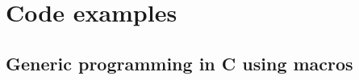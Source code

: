 \section{Code examples}

\subsection{Generic programming in C using macros}
\label{sec:generic-c}



